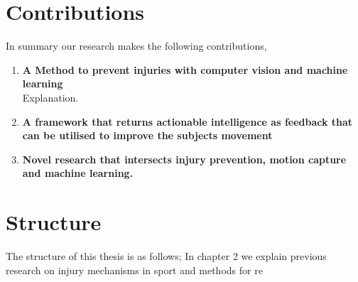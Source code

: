 \section{Contributions}
In summary our research makes the following contributions,
\begin{enumerate}
    \item \textbf{A Method to prevent injuries with computer vision and machine learning} \\ 
    Explanation.
    
    \item \textbf{A framework that returns actionable intelligence as feedback that can be utilised to improve the subjects movement}
    
    \item \textbf{Novel research that intersects injury prevention, motion capture and machine learning.}
\end{enumerate}

\section{Structure}
The structure of this thesis is as follows; In chapter 2 we explain previous research on injury mechanisms in sport and methods for re






